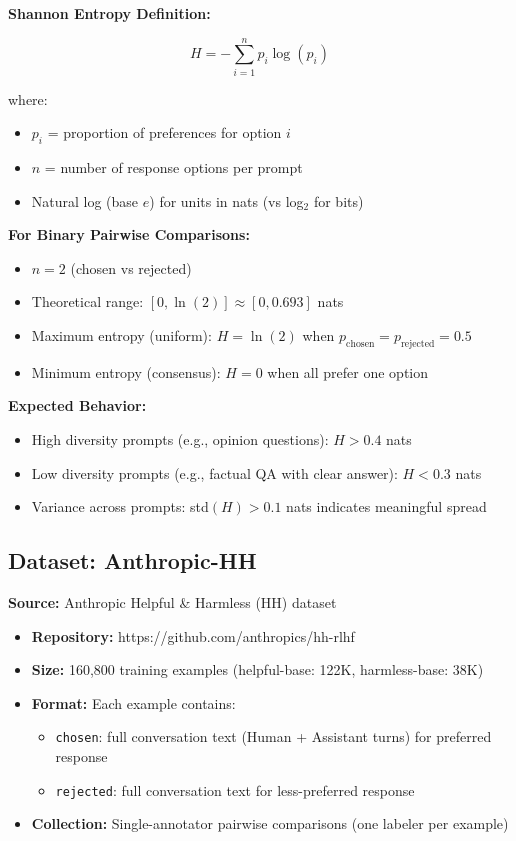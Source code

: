 \textbf{Shannon Entropy Definition:}

\begin{equation}
H = -\sum_{i=1}^{n} p_i \log(p_i)
\end{equation}

where:
\begin{itemize}
\item $p_i$ = proportion of preferences for option $i$
\item $n$ = number of response options per prompt
\item Natural log (base $e$) for units in nats (vs log$_2$ for bits)
\end{itemize}

\textbf{For Binary Pairwise Comparisons:}
\begin{itemize}
\item $n = 2$ (chosen vs rejected)
\item Theoretical range: $[0, \ln(2)] \approx [0, 0.693]$ nats
\item Maximum entropy (uniform): $H = \ln(2)$ when $p_{\text{chosen}} = p_{\text{rejected}} = 0.5$
\item Minimum entropy (consensus): $H = 0$ when all prefer one option
\end{itemize}

\textbf{Expected Behavior:}
\begin{itemize}
\item High diversity prompts (e.g., opinion questions): $H > 0.4$ nats
\item Low diversity prompts (e.g., factual QA with clear answer): $H < 0.3$ nats
\item Variance across prompts: std$(H) > 0.1$ nats indicates meaningful spread
\end{itemize}

\subsection{Dataset: Anthropic-HH}

\textbf{Source:} Anthropic Helpful \& Harmless (HH) dataset \cite{bai2022constitutional}
\begin{itemize}
\item \textbf{Repository:} https://github.com/anthropics/hh-rlhf
\item \textbf{Size:} 160,800 training examples (helpful-base: 122K, harmless-base: 38K)
\item \textbf{Format:} Each example contains:
  \begin{itemize}
  \item \texttt{chosen}: full conversation text (Human + Assistant turns) for preferred response
  \item \texttt{rejected}: full conversation text for less-preferred response
  \end{itemize}
\item \textbf{Collection:} Single-annotator pairwise comparisons (one labeler per example)
\end{itemize}

